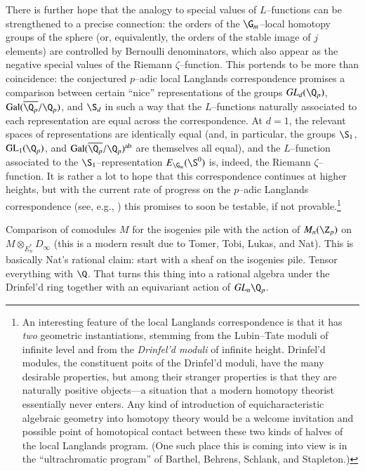 There is further hope that the analogy to special values of $L$--functions can be strengthened to a precise connection: the orders of the $\G_m$--local homotopy groups of the sphere (or, equivalently, the orders of the stable image of $j$ elements) are controlled by Bernoulli denominators, which also appear as the negative special values of the Riemann $\zeta$--function.  This portends to be more than coincidence: the conjectured $p$--adic local Langlands correspondence promises a comparison between certain ``nice'' representations of the groups $\mathit{GL}_d(\Q_p)$, $\operatorname{Gal}(\overline{\Q_p} / \Q_p)$, and $\S_d$ in such a way that the $L$--functions naturally associated to each representation are equal across the correspondence.  At $d = 1$, the relevant spaces of representations are identically equal (and, in particular, the groups $\S_1$, $\mathrm{GL}_1(\Q_p)$, and $\operatorname{Gal}(\overline{\Q_p} / \Q_p)^{\mathrm{ab}}$ are themselves all equal), and the $L$--function associated to the $\S_1$--representation $E_{\G_m}(\S^0)$ is, indeed, the Riemann $\zeta$--function.  It is rather a lot to hope that this correspondence continues at higher heights, but with the current rate of progress on the $p$--adic Langlands correspondence (see, e.g., \cite{KnightThesis}) this promises to soon be testable, if not provable.\footnote{An interesting feature of the local Langlands correspondence is that it has \emph{two} geometric instantiations, stemming from the Lubin--Tate moduli of infinite level and from the \emph{Drinfel'd moduli} of infinite height.  Drinfel'd modules, the constituent poits of the Drinfel'd moduli, have the many desirable properties, but among their stranger properties is that they are naturally positive objects---a situation that a modern homotopy theorist essentially never enters.  Any kind of introduction of equicharacteristic algebraic geometry into homotopy theory would be a welcome invitation and possible point of homotopical contact between these two kinds of halves of the local Langlands program.  (One such place this is coming into view is in the ``ultrachromatic program'' of Barthel, Behrens, Schlank, and Stapleton.)}







Comparison of comodules $M$ for the isogenies pile with the action of $M_n(\Z_p)$ on $M \otimes_{E_n^*} D_\infty$ (this is a modern result due to Tomer, Tobi, Lukas, and Nat).  This is basically Nat's rational claim: start with a sheaf on the isogenies pile.  Tensor everything with $\Q$.  That turns this thing into a rational algebra under the Drinfel'd ring together with an equivariant action of $\GL_n \Q_p$.









